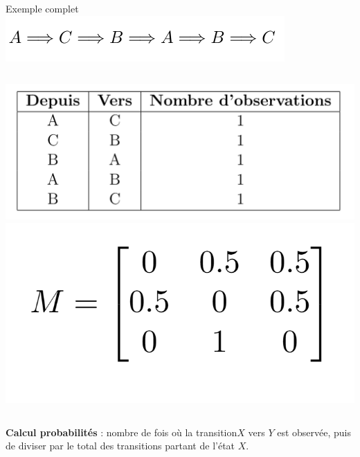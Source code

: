 \begin{frame}{Exemple complet}
	\vspace{-0.5cm}
	\centering
	\includegraphics[width=0.8\textwidth]{images/transition_ex_markov.png}
	\vspace{1cm}
	\begin{columns}
		\includegraphics[width=\textwidth]{images/tableau_ex_markov.png}
		\includegraphics[width=\textwidth]{images/matrice_markov.png}
	\end{columns}
	\vspace{1cm}
	\textbf{Calcul probabilités} :  nombre de fois où la transition\(X\) vers \(Y\) est observée, puis de diviser par le total des transitions partant de l'état \(X\).
\end{frame}

